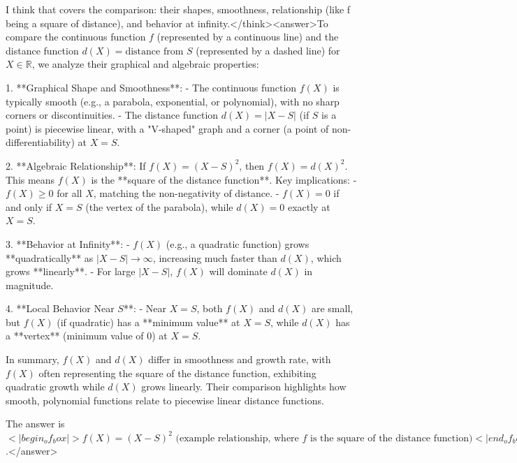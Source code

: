 I think that covers the comparison: their shapes, smoothness, relationship (like f being a square of distance), and behavior at infinity.</think><answer>To compare the continuous function \( f \) (represented by a continuous line) and the distance function \( d(X) = \text{distance from } S \) (represented by a dashed line) for \( X \in \mathbb{R} \), we analyze their graphical and algebraic properties:  

1. **Graphical Shape and Smoothness**:  
   - The continuous function \( f(X) \) is typically smooth (e.g., a parabola, exponential, or polynomial), with no sharp corners or discontinuities.  
   - The distance function \( d(X) = |X - S| \) (if \( S \) is a point) is piecewise linear, with a "V-shaped" graph and a corner (a point of non-differentiability) at \( X = S \).  

2. **Algebraic Relationship**:  
   If \( f(X) = (X - S)^2 \), then \( f(X) = d(X)^2 \). This means \( f(X) \) is the **square of the distance function**. Key implications:  
   - \( f(X) \geq 0 \) for all \( X \), matching the non-negativity of distance.  
   - \( f(X) = 0 \) if and only if \( X = S \) (the vertex of the parabola), while \( d(X) = 0 \) exactly at \( X = S \).  

3. **Behavior at Infinity**:  
   - \( f(X) \) (e.g., a quadratic function) grows **quadratically** as \( |X - S| \to \infty \), increasing much faster than \( d(X) \), which grows **linearly**.  
   - For large \( |X - S| \), \( f(X) \) will dominate \( d(X) \) in magnitude.  

4. **Local Behavior Near \( S \)**:  
   - Near \( X = S \), both \( f(X) \) and \( d(X) \) are small, but \( f(X) \) (if quadratic) has a **minimum value** at \( X = S \), while \( d(X) \) has a **vertex** (minimum value of 0) at \( X = S \).  

In summary, \( f(X) \) and \( d(X) \) differ in smoothness and growth rate, with \( f(X) \) often representing the square of the distance function, exhibiting quadratic growth while \( d(X) \) grows linearly. Their comparison highlights how smooth, polynomial functions relate to piecewise linear distance functions.  

The answer is \(<|begin_of_box|>f(X) = (X - S)^2 \text{ (example relationship, where } f \text{ is the square of the distance function)}<|end_of_box|>\).</answer>